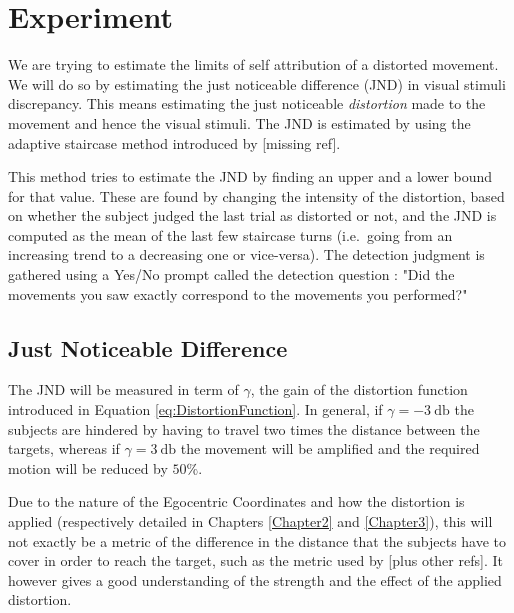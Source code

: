 
\chapter{Experiment} %

\label{Chapter4} %

We are trying to estimate the limits of self attribution of a distorted movement. We will do so by estimating the just noticeable difference (JND) in visual stimuli discrepancy. This means estimating the just noticeable \textit{distortion} made to the movement and hence the visual stimuli. The JND is estimated by using the adaptive staircase method introduced by [missing ref].

This method tries to estimate the JND by finding an upper and a lower bound for that value. These are found by changing the intensity of the distortion, based on whether the subject judged the last trial as distorted or not, and the JND is computed as the mean of the last few staircase turns (i.e.\ going from an increasing trend to a decreasing one or vice-versa). The detection judgment is gathered using a Yes/No prompt called the detection question : "Did the movements you saw exactly correspond to the movements you performed?"

\section{Just Noticeable Difference}

The JND will be measured in term of $\gamma$, the gain of the distortion function introduced in Equation \ref{eq:DistortionFunction}. In general, if $\gamma = \SI{-3}{\decibel}$ the subjects are hindered by having to travel two times the distance between the targets, whereas if $\gamma = \SI{3}{\decibel}$ the movement will be amplified and the required motion will be reduced by $50\%$.

Due to the nature of the Egocentric Coordinates and how the distortion is applied (respectively detailed in Chapters \ref{Chapter2} and \ref{Chapter3}), this will not exactly be a metric of the difference in the distance that the subjects have to cover in order to reach the target, such as the metric used by \cite{debarba2017embodiment} [plus other refs]. It however gives a good understanding of the strength and the effect of the applied distortion.

